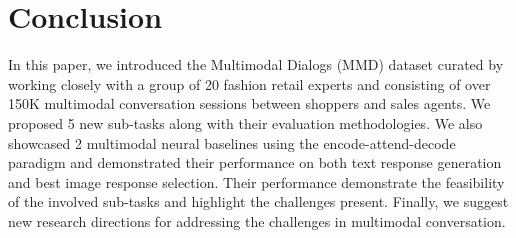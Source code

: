 \documentclass[letterpaper]{article} %
\begin{document}
\section{Conclusion}
In this paper, we introduced the Multimodal Dialogs (MMD) dataset curated by working closely with a group of 20 fashion retail experts and consisting of over 150K multimodal conversation sessions between shoppers and sales agents. We proposed 5 new sub-tasks along with their evaluation methodologies. We also showcased 2 multimodal neural baselines using the encode-attend-decode paradigm and demonstrated their performance on both text response generation and best image response selection. Their performance demonstrate the feasibility of the involved sub-tasks and highlight the challenges present. Finally, we suggest new research directions for addressing the challenges in multimodal conversation.





\end{document}
